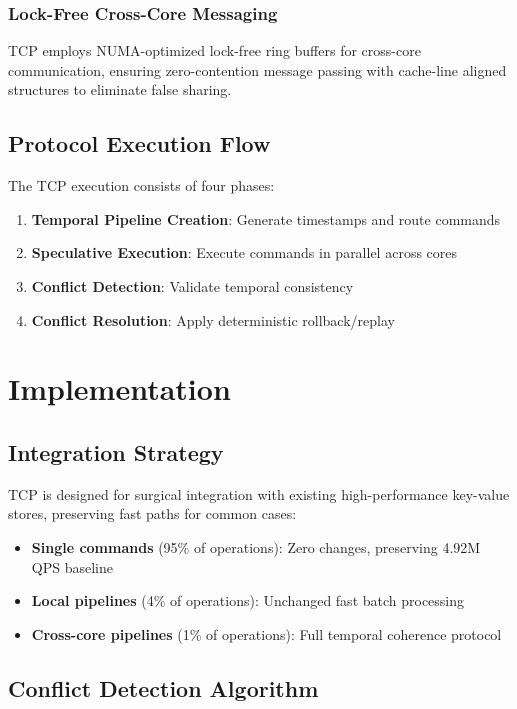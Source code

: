 \documentclass[conference]{IEEEtran}
\begin{document}
\subsubsection{Lock-Free Cross-Core Messaging}

TCP employs NUMA-optimized lock-free ring buffers for cross-core communication, ensuring zero-contention message passing with cache-line aligned structures to eliminate false sharing.

\subsection{Protocol Execution Flow}

The TCP execution consists of four phases:

\begin{enumerate}
\item \textbf{Temporal Pipeline Creation}: Generate timestamps and route commands
\item \textbf{Speculative Execution}: Execute commands in parallel across cores
\item \textbf{Conflict Detection}: Validate temporal consistency
\item \textbf{Conflict Resolution}: Apply deterministic rollback/replay
\end{enumerate}

\section{Implementation}

\subsection{Integration Strategy}

TCP is designed for surgical integration with existing high-performance key-value stores, preserving fast paths for common cases:

\begin{itemize}
\item \textbf{Single commands} (95\% of operations): Zero changes, preserving 4.92M QPS baseline
\item \textbf{Local pipelines} (4\% of operations): Unchanged fast batch processing
\item \textbf{Cross-core pipelines} (1\% of operations): Full temporal coherence protocol
\end{itemize}

\subsection{Conflict Detection Algorithm}
\end{document}
